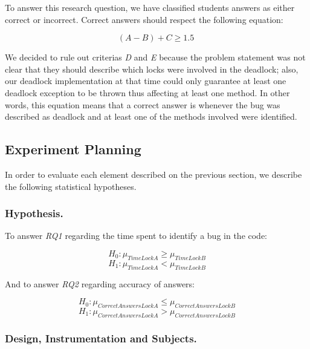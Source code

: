 To answer this research question, we have classified students answers as either correct or incorrect. Correct answers should respect the following equation:

\begin{equation}
  (A - B) + C \geq 1.5 \;
\end{equation}

We decided to rule out criterias \emph{D} and \emph{E} because the problem statement was not clear that they should describe which locks were involved in the deadlock; also, our deadlock implementation at that time could only guarantee at least one deadlock exception to be thrown thus affecting at least one method. In other words, this equation means that a correct answer is whenever the bug was described as deadlock and at least one of the methods involved were identified.

\subsection{Experiment Planning}

In order to evaluate each element described on the previous section, we describe the following statistical hypotheses.

\subsubsection{Hypothesis.}

To answer \emph{RQ1} regarding the time spent to identify a bug in the code:

\begin{equation}
  H_{0} : \mu_{TimeLockA} \geq \mu_{TimeLockB}
\end{equation}
\begin{equation}
  H_{1} : \mu_{TimeLockA} < \mu_{TimeLockB}
\end{equation}

And to answer \emph{RQ2} regarding accuracy of answers:

\begin{equation}
  H_{0} : \mu_{CorrectAnswersLockA} \leq \mu_{CorrectAnswersLockB}
\end{equation}
\begin{equation}
  H_{1} : \mu_{CorrectAnswersLockA} > \mu_{CorrectAnswersLockB}
\end{equation}

\subsubsection{Design, Instrumentation and Subjects.}

